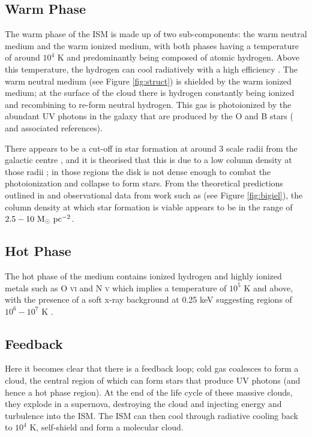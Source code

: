 \subsection{Warm Phase}

The warm phase of the ISM is made up of two sub-components: the warm neutral medium and the warm ionized medium, with both phases having a temperature of around $10^4$ K and predominantly being composed of atomic hydrogen.
Above this temperature, the hydrogen can cool radiatively with a high efficiency \citep{gnat_time-dependent_2007}.
The warm neutral medium (see Figure \ref{fig:struct}) is shielded by the warm ionized medium; at the surface of the cloud there is hydrogen constantly being ionized and recombining to re-form neutral hydrogen.
This gas is photoionized by the abundant UV photons in the galaxy that are produced by the O and B stars (\citet{lefloch_photoionization_2001} and associated references).

There appears to be a cut-off in star formation at around 3 scale radii from the galactic centre \citep{kennicutt_star_1989, martin_star_2001}, and it is theorised that this is due to a low column density at those radii \citep{schaye_star_2004}; in those regions the disk is not dense enough to combat the photoionization and collapse to form stars.
From the theoretical predictions outlined in \citep{schaye_star_2004} and observational data from work such as \citet{bigiel_star_2008} (see Figure \ref{fig:bigiel}), the column density at which star formation is viable appears to be in the range of $2.5 - 10 ~\mathrm{M}_{\odot} ~\mathrm{pc}^{-2}$.

\subsection{Hot Phase}

The hot phase of the medium contains ionized hydrogen and highly ionized metals such as O \textsc{vi} and N \textsc{v} which implies a temperature of $10^{5}$ K and above, with the presence of a soft x-ray background at 0.25 keV suggesting regions of $10^6 - 10^7$ K \citep{ferriere_interstellar_2001}.

\subsection{Feedback}

Here it becomes clear that there is a feedback loop; cold gas coalesces to form a cloud, the central region of which can form stars that produce UV photons (and hence a hot phase region).
At the end of the life cycle of these massive clouds, they explode in a supernova, destroying the cloud and injecting energy and turbulence into the ISM.
The ISM can then cool through radiative cooling back to $10^4$ K, self-shield and form a molecular cloud.

